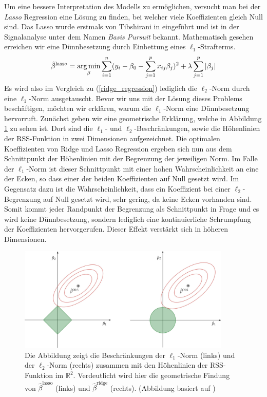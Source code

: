 Um eine bessere Interpretation des Modells zu ermöglichen, versucht man bei der \textit{Lasso} Regression eine Lösung zu finden, bei welcher viele Koeffizienten gleich Null sind. Das Lasso wurde erstmals von Tibshirani in \cite{tibshirani_lasso} eingeführt und ist in der Signalanalyse unter dem Namen \textit{Basis Pursuit} \cite{chen} bekannt. Mathematisch gesehen erreichen wir eine Dünnbesetzung durch Einbettung eines $\ell_1$-Strafterms.
\begin{align}
\label{lasso_formulation}
\hat{\beta}^{\text{lasso}} = \operatorname*{arg\,min}_{\beta} \sum_{i=1}^{n}(y_i - \beta_0 - \sum_{j=1}^p x_{ij}\beta_j)^2 + \lambda\sum_{j=1}^p \left|\beta_j\right|
\end{align}
Es wird also im Vergleich zu (\ref{ridge_regression}) lediglich die $\ell_2$-Norm durch eine $\ell_1$-Norm ausgetauscht. Bevor wir uns mit der Lösung dieses Problems beschäftigen, möchten wir erklären, warum die $\ell_1$-Norm eine Dünnbesetzung hervorruft. Zunächst geben wir eine geometrische Erklärung, welche in Abbildung \ref{lasso_ridge_regression_figure} zu sehen ist. Dort sind die $\ell_1$- und $\ell_2$-Beschränkungen, sowie die Höhenlinien der RSS-Funktion in zwei Dimensionen aufgezeichnet. Die optimalen Koeffizienten von Ridge und Lasso Regression ergeben sich nun aus dem Schnittpunkt der Höhenlinien mit der Begrenzung der jeweiligen Norm. Im Falle der $\ell_1$-Norm ist dieser Schnittpunkt mit einer hohen Wahrscheinlichkeit an eine der Ecken, so dass einer der beiden Koeffizienten auf Null gesetzt wird. Im Gegensatz dazu ist die Wahrscheinlichkeit, dass ein Koeffizient bei einer $\ell_2$-Begrenzung auf Null gesetzt wird, sehr gering, da keine Ecken vorhanden sind. Somit kommt jeder Randpunkt der Begrenzung als Schnittpunkt in Frage und es wird keine Dünnbesetzung, sondern lediglich eine kontinuierliche Schrumpfung der Koeffizienten hervorgerufen. Dieser Effekt verstärkt sich in höheren Dimensionen.

\begin{figure}
\centering
\includegraphics[width = 0.9\textwidth]{figures/lasso_ridge_regression.jpg}
\caption{Die Abbildung zeigt die Beschränkungen der $\ell_1$-Norm (links) und der $\ell_2$-Norm (rechts) zusammen mit den Höhenlinien der RSS-Funktion im $\mathbb{R}^2$. Verdeutlicht wird hier die geometrische Findung von $\hat{\beta}^{\text{lasso}}$ (links) und $\hat{\beta}^{\text{ridge}}$ (rechts). (Abbildung basiert auf \cite{hastie_elements})}
\label{lasso_ridge_regression_figure}
\end{figure}

